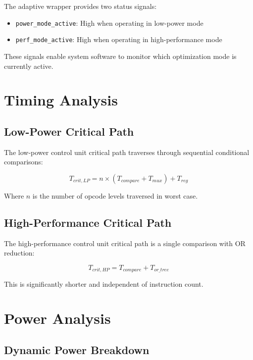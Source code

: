 \documentclass[15pt,a4paper]{report}
\begin{document}
The adaptive wrapper provides two status signals:
\begin{itemize}
    \item \texttt{power\_mode\_active}: High when operating in low-power mode
    \item \texttt{perf\_mode\_active}: High when operating in high-performance mode
\end{itemize}

These signals enable system software to monitor which optimization mode is currently active.

\section{Timing Analysis}

\subsection{Low-Power Critical Path}

The low-power control unit critical path traverses through sequential conditional comparisons:

\begin{equation}
T_{crit,LP} = n \times (T_{compare} + T_{mux}) + T_{reg}
\end{equation}

Where $n$ is the number of opcode levels traversed in worst case.

\subsection{High-Performance Critical Path}

The high-performance control unit critical path is a single comparison with OR reduction:

\begin{equation}
T_{crit,HP} = T_{compare} + T_{or\_tree}
\end{equation}

This is significantly shorter and independent of instruction count.

\section{Power Analysis}

\subsection{Dynamic Power Breakdown}
\end{document}
